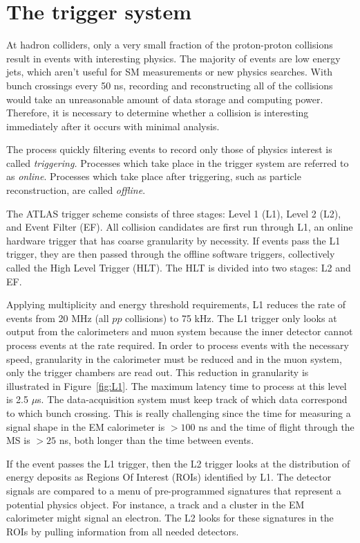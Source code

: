 \section{The trigger system}
At hadron colliders, only a very small fraction of the proton-proton collisions result in events with interesting physics. The majority of events are low energy jets, which aren't useful for SM measurements or new physics searches. With bunch crossings every 50 ns, recording and reconstructing all of the collisions would take an unreasonable amount of data storage and computing power. Therefore, it is necessary to determine whether a collision is interesting immediately after it occurs with minimal analysis. 

The process quickly filtering events to record only those of physics interest is called \emph{triggering.} Processes which take place in the trigger system are referred to as \emph{online}. Processes which take place after triggering, such as particle reconstruction, are called \emph{offline}.

The ATLAS trigger scheme\cite{TDR-L1} consists of three stages: Level 1 (L1), Level 2 (L2), and Event Filter (EF). All collision candidates are first run through L1, an online hardware trigger that has coarse granularity by necessity. If events pass the L1 trigger, they are then passed through the offline software triggers, collectively called the High Level Trigger (HLT). The HLT is divided into two stages: L2 and EF.

Applying multiplicity and energy threshold requirements, L1 reduces the rate of events from 20 MHz (all $pp$ collisions) to 75 kHz. The L1 trigger only looks at output from the calorimeters and muon system because the inner detector cannot process events at the rate required. In order to process events with the necessary speed, granularity in the calorimeter must be reduced and in the muon system, only the trigger chambers are read out. This reduction in granularity is illustrated in Figure~\ref{fig:L1}. The maximum latency time to process at this level is 2.5 $\mu$s. The data-acquisition system must keep track of which data correspond to which bunch crossing. This is really challenging since the time for measuring a signal shape in the EM calorimeter is $>100$ ns and the time of flight through the MS is $>25$ ns, both longer than the time between events. 

If the event passes the L1 trigger, then the L2 trigger looks at the distribution of energy deposits as Regions Of Interest (ROIs) identified by L1. The detector signals are compared to a menu of pre-programmed signatures that represent a potential physics object. For instance, a track and a cluster in the EM calorimeter might signal an electron. The L2 looks for these signatures in the ROIs by pulling information from all needed detectors. 

